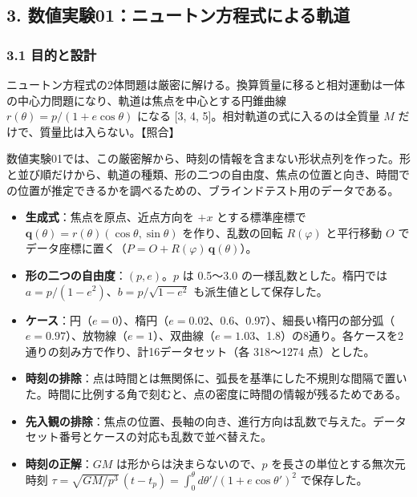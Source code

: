 \documentclass[
  a4paper,
]{ltjsarticle}
\providecommand{\tightlist}{%
  \setlength{\itemsep}{0pt}\setlength{\parskip}{0pt}}
\begin{document}
\subsection{3.
数値実験01：ニュートン方程式による軌道}\label{ux6570ux5024ux5b9fux9a1301ux30cbux30e5ux30fcux30c8ux30f3ux65b9ux7a0bux5f0fux306bux3088ux308bux8eccux9053}

\subsubsection{3.1 目的と設計}\label{ux76eeux7684ux3068ux8a2dux8a08}

ニュートン方程式の2体問題は厳密に解ける。換算質量に移ると相対運動は一体の中心力問題になり、軌道は焦点を中心とする円錐曲線
\(r(\theta)=p/(1+e\cos\theta)\) になる {[}3, 4,
5{]}。相対軌道の式に入るのは全質量 \(M\)
だけで、質量比は入らない。【照合】

数値実験01では、この厳密解から、時刻の情報を含まない形状点列を作った。形と並び順だけから、軌道の種類、形の二つの自由度、焦点の位置と向き、時間での位置が推定できるかを調べるための、ブラインドテスト用のデータである。

\begin{itemize}
\tightlist
\item
  \textbf{生成式}：焦点を原点、近点方向を \(+x\) とする標準座標で
  \(\mathbf q(\theta)=r(\theta)(\cos\theta,\sin\theta)\)
  を作り、乱数の回転 \(R(\varphi)\) と平行移動 \(O\)
  でデータ座標に置く（\(P=O+R(\varphi)\,\mathbf q(\theta)\)）。
\item
  \textbf{形の二つの自由度}：\((p, e)\)。\(p\) は 0.5〜3.0
  の一様乱数とした。楕円では \(a=p/(1-e^2)\)、\(b=p/\sqrt{1-e^2}\)
  も派生値として保存した。
\item
  \textbf{ケース}：円（\(e=0\)）、楕円（\(e=0.02\)、0.6、0.97）、細長い楕円の部分弧（\(e=0.97\)）、放物線（\(e=1\)）、双曲線（\(e=1.03\)、1.8）の8通り。各ケースを2通りの刻み方で作り、計16データセット（各
  318〜1274 点）とした。
\item
  \textbf{時刻の排除}：点は時間とは無関係に、弧長を基準にした不規則な間隔で置いた。時間に比例する角で刻むと、点の密度に時間の情報が残るためである。
\item
  \textbf{先入観の排除}：焦点の位置、長軸の向き、進行方向は乱数で与えた。データセット番号とケースの対応も乱数で並べ替えた。
\item
  \textbf{時刻の正解}：\(GM\) は形からは決まらないので、\(p\)
  を長さの単位とする無次元時刻
  \(\tau=\sqrt{GM/p^3}\,(t-t_p)=\int_0^\theta d\theta'/(1+e\cos\theta')^2\)
  で保存した。
\end{itemize}
\end{document}
